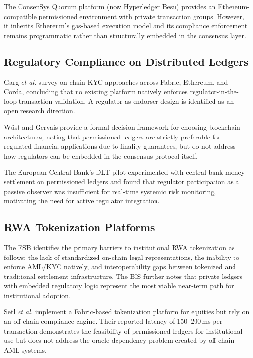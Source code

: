 \documentclass[journal,10pt,twocolumn]{IEEEtran}
\begin{document}
The ConsenSys Quorum platform (now Hyperledger Besu) \cite{ref:quorum} provides an Ethereum-compatible permissioned environment with private transaction groups. However, it inherits Ethereum's gas-based execution model and its compliance enforcement remains programmatic rather than structurally embedded in the consensus layer.

\subsection{Regulatory Compliance on Distributed Ledgers}

Garg \textit{et al.} \cite{ref:garg2021} survey on-chain KYC approaches across Fabric, Ethereum, and Corda, concluding that no existing platform natively enforces regulator-in-the-loop transaction validation. A regulator-as-endorser design is identified as an open research direction.

Wüst and Gervais \cite{ref:wust2018} provide a formal decision framework for choosing blockchain architectures, noting that permissioned ledgers are strictly preferable for regulated financial applications due to finality guarantees, but do not address how regulators can be embedded in the consensus protocol itself.

The European Central Bank's DLT pilot \cite{ref:ecb_dlt} experimented with central bank money settlement on permissioned ledgers and found that regulator participation as a passive observer was insufficient for real-time systemic risk monitoring, motivating the need for active regulator integration.

\subsection{RWA Tokenization Platforms}

The FSB \cite{ref:rwa_fsb} identifies the primary barriers to institutional RWA tokenization as follows: the lack of standardized on-chain legal representations, the inability to enforce AML/KYC natively, and interoperability gaps between tokenized and traditional settlement infrastructure. The BIS \cite{ref:bis_tokenisation} further notes that private ledgers with embedded regulatory logic represent the most viable near-term path for institutional adoption.

Setl \textit{et al.} \cite{ref:setl2023} implement a Fabric-based tokenization platform for equities but rely on an off-chain compliance engine. Their reported latency of 150--200\,ms per transaction demonstrates the feasibility of permissioned ledgers for institutional use but does not address the oracle dependency problem created by off-chain AML systems.
\end{document}
